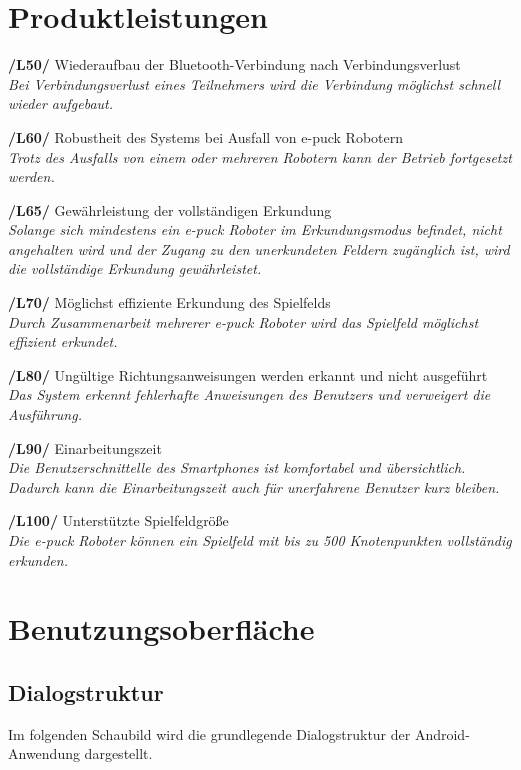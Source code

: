 \documentclass[10pt,a4paper]{article}
\let\oldsection\section
\renewcommand{\section}{\newpage \oldsection}
\begin{document}
	\section{Produktleistungen}
		\begin{list}{}{\leftmargin=1cm}
			\item[\textbf{/L50/}] Wiederaufbau der Bluetooth-Verbindung nach Verbindungsverlust
				\\ \textsl{Bei Verbindungsverlust eines Teilnehmers wird die Verbindung möglichst schnell wieder aufgebaut.}
			\item[\textbf{/L60/}] Robustheit des Systems bei Ausfall von e-puck Robotern
				\\ \textsl{Trotz des Ausfalls von einem oder mehreren Robotern kann der Betrieb fortgesetzt werden.}
			\item[\textbf{/L65/}] Gewährleistung der vollständigen Erkundung
				\\ \textsl{Solange sich mindestens ein e-puck Roboter im Erkundungsmodus befindet, nicht angehalten wird
					und der Zugang zu den unerkundeten Feldern zugänglich ist, wird die vollständige Erkundung gewährleistet.}		
			\item[\textbf{/L70/}] Möglichst effiziente Erkundung des Spielfelds
				\\ \textsl{Durch Zusammenarbeit mehrerer e-puck Roboter wird das Spielfeld möglichst effizient erkundet.}						
			\item[\textbf{/L80/}] Ungültige Richtungsanweisungen werden erkannt und nicht ausgeführt 
				\\ \textsl{Das System erkennt fehlerhafte Anweisungen des Benutzers und verweigert die Ausführung.}					
			\item[\textbf{/L90/}] Einarbeitungszeit 
				\\ \textsl{Die Benutzerschnittelle des Smartphones ist komfortabel und übersichtlich. Dadurch kann die Einarbeitungszeit
					auch für unerfahrene Benutzer kurz bleiben.}
			\item[\textbf{/L100/}] Unterstützte Spielfeldgröße 
				\\ \textsl{Die e-puck Roboter können ein Spielfeld mit bis zu 500 Knotenpunkten vollständig erkunden.}							
		\end{list}						
	\section{Benutzungsoberfläche}
	
			\subsection{Dialogstruktur}
			Im folgenden Schaubild wird die grundlegende Dialogstruktur der Android-Anwendung dargestellt.
			
\end{document}
